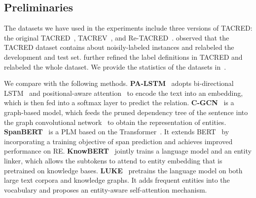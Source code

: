 \documentclass[11pt,a4paper]{article}
\newcommand{\stitle}[1]{\vspace{0.3em}\noindent{\bf #1}}
\begin{document}
\subsection{Preliminaries}\label{ssec:exp_prelim}

\stitle{Datasets.} The datasets we have used in the experiments include three versions of TACRED: the original TACRED~\cite{zhang-etal-2017-position}, TACREV~\cite{alt-etal-2020-tacred}, and Re-TACRED~\cite{stoica2021re}.
\citet{alt-etal-2020-tacred} observed that the TACRED dataset contains about  noisily-labeled instances and relabeled the development and test set.
\citet{stoica2021re} further refined the label definitions in TACRED and relabeled the whole dataset.
We provide the statistics of the datasets in~.

\stitle{Compared methods.}
We compare with the following methods.
\textbf{PA-LSTM}~\cite{zhang-etal-2017-position} adopts bi-directional LSTM~\cite{Hochreiter1997LongSM} and positional-aware attention~\cite{Bahdanau2015NeuralMT} to encode the text into an embedding, which is then fed into a softmax layer to predict the relation.
\textbf{C-GCN}~\cite{zhang-etal-2018-graph} is a graph-based model, which feeds the pruned dependency tree of the sentence into the graph convolutional network~\cite{Kipf2017SemiSupervisedCW} to obtain the representation of entities.
\textbf{SpanBERT}~\cite{joshi-etal-2020-spanbert} is a PLM based on the Transformer~\cite{vaswani2017attention}. It extends BERT~\cite{devlin-etal-2019-bert} by incorporating a training objective of span prediction and achieves improved performance on RE.
\textbf{KnowBERT}~\cite{peters-etal-2019-knowledge} jointly trains a language model and an entity linker, which allows the subtokens to attend to entity embedding that is pretrained on knowledge bases.
\textbf{LUKE}~\cite{yamada-etal-2020-luke} pretrains the language model on both large text corpora and knowledge graphs. It adds frequent entities into the vocabulary and proposes an entity-aware self-attention mechanism.
\iffalse
\end{document}
